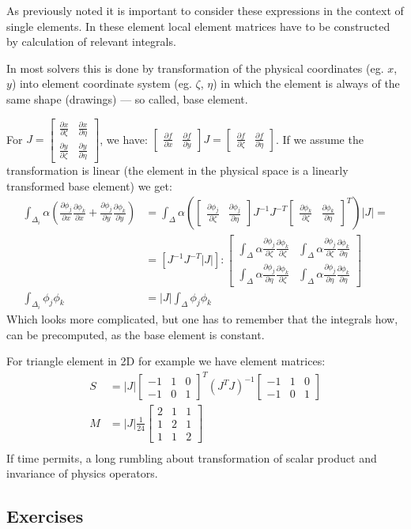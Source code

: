 \documentclass{article}
\newcommand{\mat}[1]{\left[\begin{matrix}#1\end{matrix}\right]}
\newcommand{\rr}[2]{\frac{\partial #1}{\partial #2}}
\begin{document}
As previously noted it is important to consider these expressions in the context of single elements. In these element local element matrices have to be constructed by calculation of relevant integrals.

In most solvers this is done by transformation of the physical coordinates (eg. $x$, $y$) into element coordinate system (eg. $\zeta$, $\eta$) in which the element is always of the same shape (drawings) --- so called, base element.

For $J = \mat{\rr{x}{\zeta} & \rr{x}{\eta}\\\rr{y}{\zeta} & \rr{y}{\eta}}$, we have: $\mat{\rr{f}{x}&\rr{f}{y}}J = \mat{\rr{f}{\zeta}&\rr{f}{\eta}}$. If we assume the transformation is linear (the element in the physical space is a linearly transformed base element) we get:
\newcommand{\baseelementint}[2]{\int_{\Delta}\alpha\rr{\phi_j}{#1}\rr{\phi_k}{#2}}
\begin{align*}    
\int_{\Delta_i}\alpha\left(\rr{\phi_j}{x}\rr{\phi_k}{x} + \rr{\phi_j}{y}\rr{\phi_k}{y}\right) &= \int_{\Delta}\alpha\left(\mat{\rr{\phi_j}{\zeta}&\rr{\phi_j}{\eta}}J^{-1}J^{-T}\mat{\rr{\phi_k}{\zeta}&\rr{\phi_k}{\eta}}^T\right)|J| =\\
&= \left[J^{-1}J^{-T}|J|\right]:\mat{\baseelementint{\zeta}{\zeta} & \baseelementint{\zeta}{\eta} \\ \baseelementint{\eta}{\zeta} & \baseelementint{\eta}{\eta}}\\
\int_{\Delta_i}\phi_j\phi_k &= |J|\int_{\Delta}\phi_j\phi_k
\end{align*}
Which looks more complicated, but one has to remember that the integrals how, can be precomputed, as the base element is constant.

For triangle element in 2D for example we have element matrices:
\begin{align*}
    S &= |J|\mat{-1&1&0\\-1&0&1}^T(J^TJ)^{-1}\mat{-1&1&0\\-1&0&1}\\
    M &= |J|\frac{1}{24}\mat{2&1&1\\1&2&1\\1&1&2}\\
\end{align*}
If time permits, a long rumbling about transformation of scalar product and invariance of physics operators.

\subsection*{Exercises}
\end{document}
